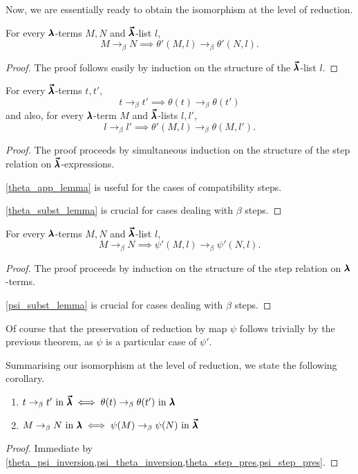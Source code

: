 Now, we are essentially ready to obtain the isomorphism at the level of reduction.

\begin{lemma}
  \label{theta_step_lemma}
  For every $\pmb{\lambda}$-terms $M, N$ and $\pmb{\vec \lambda}$-list $l$,
  \[ M \to_{\beta} N \implies \theta'(M, l) \to_{\beta} \theta'(N, l). \]
\end{lemma}
\begin{proof}
  The proof follows easily by induction on the structure of the $\pmb{\vec \lambda}$-list $l$.
\end{proof}

\begin{theorem}
  \label{theta_step_pres}
  For every $\pmb{\vec \lambda}$-terms $t, t'$,
  \[ t \to_{\beta} t' \implies \theta(t) \to_{\beta} \theta(t') \]
  and also, for every $\pmb{\lambda}$-term $M$ and $\pmb{\vec \lambda}$-lists $l, l'$,
  \[ l \to_{\beta} l' \implies \theta'(M, l) \to_{\beta} \theta(M, l'). \]
\end{theorem}
\begin{proof}
  The proof proceeds by simultaneous induction on the structure of the step relation on $\pmb{\vec \lambda}$-expressions.

  \cref{theta_app_lemma} is useful for the cases of compatibility steps.

  \cref{theta_subst_lemma} is crucial for cases dealing with $\beta$ steps.
\end{proof}


\begin{theorem}
  \label{psi_step_pres}
  For every $\pmb{\lambda}$-terms $M, N$ and $\pmb{\vec \lambda}$-list $l$,
  \[ M \to_{\beta} N \implies \psi'(M, l) \to_{\beta} \psi'(N, l). \]
\end{theorem}
\begin{proof}
  The proof proceeds by induction on the structure of the step relation on $\pmb{\lambda}$-terms.

  \cref{psi_subst_lemma} is crucial for cases dealing with $\beta$ steps.
\end{proof}

Of course that the preservation of reduction by map $\psi$ follows trivially by the previous theorem, as $\psi$ is a particular case of $\psi'$.

Summarising our isomorphism at the level of reduction, we state the following corollary.

\begin{corollary} \hfill
  
  \begin{enumerate}
  \item $t \to_{\beta} t' \text{ in } \pmb{\vec \lambda} \iff \theta(t) \to_{\beta} \theta(t') \text{ in } \pmb{\lambda}$
  \item $M \to_{\beta} N \text{ in } \pmb{\lambda} \iff \psi(M) \to_{\beta} \psi(N) \text{ in } \pmb{\vec \lambda}$
  \end{enumerate}
\end{corollary}
\begin{proof}
  Immediate by \cref{theta_psi_inversion,psi_theta_inversion,theta_step_pres,psi_step_pres}.
\end{proof}

